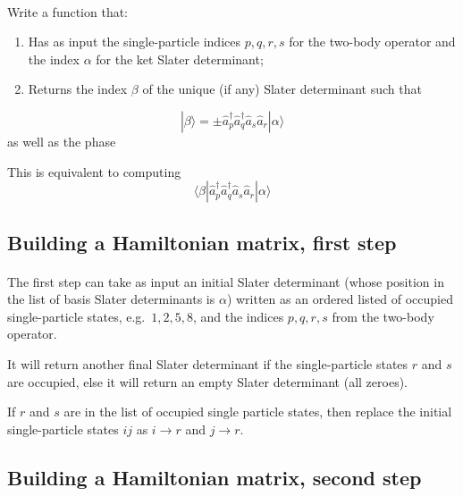 \paragraph{}
Write a function that:
\begin{enumerate}
\item Has as input the single-particle indices $p,q,r,s$ for the two-body operator and the index $\alpha$ for the ket Slater determinant;

\item Returns the index $\beta$ of the unique (if any) Slater determinant such that
\end{enumerate}

\noindent
\[
| \beta \rangle = \pm \hat{a}^\dagger_p \hat{a}^\dagger_q\hat{a}_s \hat{a}_r |\alpha \rangle
\]
as well as the phase

This is equivalent to computing
\[
\langle \beta | \hat{a}^\dagger_p \hat{a}^\dagger_q\hat{a}_s \hat{a}_r |\alpha \rangle
\]



\subsection*{Building a Hamiltonian matrix, first step}

\paragraph{}
The first step can take as input an initial Slater determinant
(whose position in the list of basis Slater determinants is $\alpha$) written as an
ordered listed of occupied single-particle states, e.g.~$1,2,5,8$, and the
indices $p,q,r,s$ from the two-body operator. 

It will return another final Slater determinant if the single-particle states $r$ and $s$ are occupied, else it will return an 
empty Slater determinant
(all zeroes). 

If $r$ and $s$ are in the list of occupied single particle states, then
replace the initial single-particle states $ij$ as $i \rightarrow r$ and $j \rightarrow r$.



\subsection*{Building a Hamiltonian matrix, second step}

